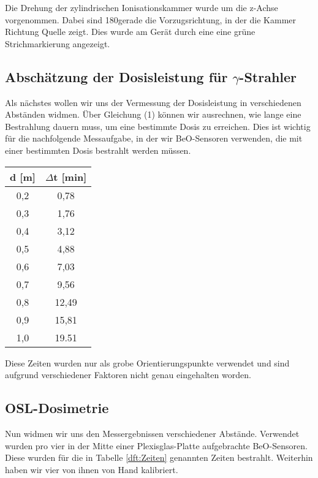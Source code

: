 Die Drehung der zylindrischen Ionisationskammer wurde um die z-Achse vorgenommen. Dabei sind 180\textdegree gerade die Vorzugsrichtung, in der die Kammer Richtung Quelle zeigt. Dies wurde am Gerät durch eine eine grüne Strichmarkierung angezeigt.

\subsection{Abschätzung der Dosisleistung für $\gamma$-Strahler}

Als nächstes wollen wir uns der Vermessung der Dosisleistung in verschiedenen Abständen widmen. Über Gleichung (1) können wir ausrechnen, wie lange eine Bestrahlung dauern muss, um eine bestimmte Dosis zu erreichen. Dies ist wichtig für die nachfolgende Messaufgabe, in der wir BeO-Sensoren verwenden, die mit einer bestimmten Dosis bestrahlt werden müssen.

\vspace{5mm}
\minipanf
	\begin{center}
		\begin{tabular}{c|c}
				   \textbf{d} [m] & \textbf{$\Delta$t} [min] \\ 
		\hline     0,2 &  0,78 \\ 
				   0,3 &  1,76 \\ 
				   0,4 &  3,12 \\ 
				   0,5 &  4,88 \\ 
				   0,6 &  7,03 \\ 
				   0,7 &  9,56 \\ 
				   0,8 & 12,49 \\ 
				   0,9 & 15,81 \\ 
				   1,0 & 19.51 \\  
		\end{tabular}
		\label{dft:Zeiten} 
	\end{center}
\minipend
\vspace{5mm}

Diese Zeiten wurden nur als grobe Orientierungspunkte verwendet und sind aufgrund verschiedener Faktoren nicht genau eingehalten worden.

\subsection{OSL-Dosimetrie}
Nun widmen wir uns den Messergebnissen verschiedener Abstände. Verwendet wurden pro vier in der Mitte einer Plexisglas-Platte aufgebrachte BeO-Sensoren. Diese wurden für die in Tabelle \ref{dft:Zeiten} genannten Zeiten bestrahlt. Weiterhin haben wir vier von ihnen von Hand kalibriert.

